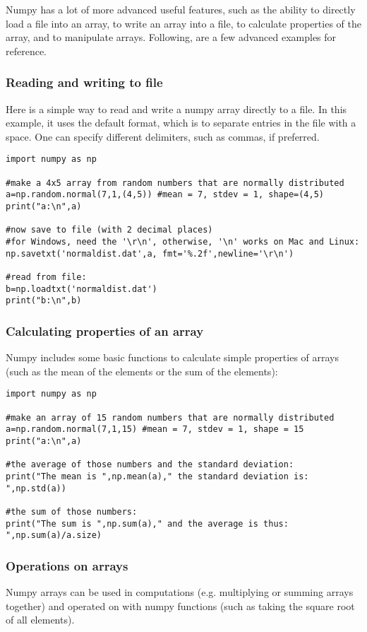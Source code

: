 Numpy has a lot of more advanced useful features, such as the ability to directly load a file into an array, to write an array into a file, to calculate properties of the array, and to manipulate arrays. Following, are a few advanced examples for reference.

\subsubsection{Reading and writing to file}
Here is a simple way to read and write a numpy array directly to a file. In this example, it uses the default format, which is to separate entries in the file with a space. One can specify different delimiters, such as commas, if preferred.
\begin{lstlisting}[frame=single] 
import numpy as np

#make a 4x5 array from random numbers that are normally distributed
a=np.random.normal(7,1,(4,5)) #mean = 7, stdev = 1, shape=(4,5)
print("a:\n",a)

#now save to file (with 2 decimal places)
#for Windows, need the '\r\n', otherwise, '\n' works on Mac and Linux:
np.savetxt('normaldist.dat',a, fmt='%.2f',newline='\r\n')

#read from file:
b=np.loadtxt('normaldist.dat')
print("b:\n",b)

\end{lstlisting} 

\subsubsection{Calculating properties of an array}
Numpy includes some basic functions to calculate simple properties of arrays (such as the mean of the elements or the sum of the elements):
\begin{lstlisting}[frame=single] 
import numpy as np

#make an array of 15 random numbers that are normally distributed
a=np.random.normal(7,1,15) #mean = 7, stdev = 1, shape = 15
print("a:\n",a)

#the average of those numbers and the standard deviation:
print("The mean is ",np.mean(a)," the standard deviation is: ",np.std(a))

#the sum of those numbers:
print("The sum is ",np.sum(a)," and the average is thus: ",np.sum(a)/a.size)

\end{lstlisting} 

\subsubsection{Operations on arrays}
Numpy arrays can be used in computations (e.g. multiplying or summing arrays together) and operated on with numpy functions (such as taking the square root of all elements).
 
